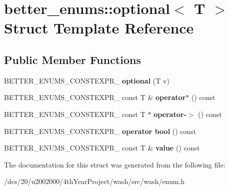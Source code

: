 \hypertarget{structbetter__enums_1_1optional}{}\section{better\+\_\+enums\+:\+:optional$<$ T $>$ Struct Template Reference}
\label{structbetter__enums_1_1optional}
\subsection*{Public Member Functions}
\begin{DoxyCompactItemize}
\item 
\mbox{\label{structbetter__enums_1_1optional_a893399829eb6dbdf7c8eb385b2ec464d}} 
B\+E\+T\+T\+E\+R\+\_\+\+E\+N\+U\+M\+S\+\_\+\+C\+O\+N\+S\+T\+E\+X\+P\+R\+\_\+ {\bfseries optional} (T v)
\item 
\mbox{\label{structbetter__enums_1_1optional_ac112a6e38895da91c4a5a96ee1a8460e}} 
B\+E\+T\+T\+E\+R\+\_\+\+E\+N\+U\+M\+S\+\_\+\+C\+O\+N\+S\+T\+E\+X\+P\+R\+\_\+ const T \& {\bfseries operator$\ast$} () const
\item 
\mbox{\label{structbetter__enums_1_1optional_a0eba3de653c3dbaa047e753a42fd59e1}} 
B\+E\+T\+T\+E\+R\+\_\+\+E\+N\+U\+M\+S\+\_\+\+C\+O\+N\+S\+T\+E\+X\+P\+R\+\_\+ const T $\ast$ {\bfseries operator-\/$>$} () const
\item 
\mbox{\label{structbetter__enums_1_1optional_a48429aab0bf3d616df7431a1871e2f75}} 
B\+E\+T\+T\+E\+R\+\_\+\+E\+N\+U\+M\+S\+\_\+\+C\+O\+N\+S\+T\+E\+X\+P\+R\+\_\+ {\bfseries operator bool} () const
\item 
\mbox{\label{structbetter__enums_1_1optional_afd33f8c0b31edbbc8db640a403899363}} 
B\+E\+T\+T\+E\+R\+\_\+\+E\+N\+U\+M\+S\+\_\+\+C\+O\+N\+S\+T\+E\+X\+P\+R\+\_\+ const T \& {\bfseries value} () const
\end{DoxyCompactItemize}


The documentation for this struct was generated from the following file\+:\begin{DoxyCompactItemize}
\item 
/dcs/20/u2002000/4th\+Year\+Project/wash/src/wash/enum.\+h\end{DoxyCompactItemize}
